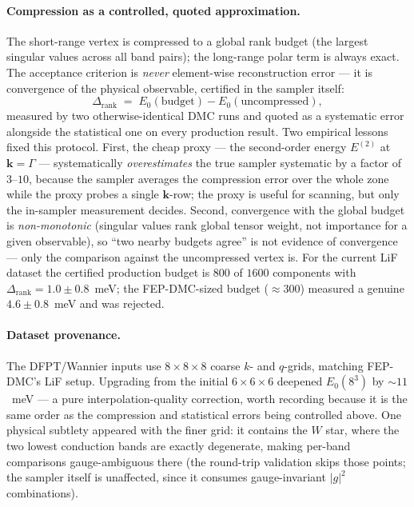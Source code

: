 \documentclass[11pt]{article}
\newcommand{\kv}{\mathbf{k}}
\begin{document}
\paragraph{Compression as a controlled, quoted approximation.}
The short-range vertex is compressed to a global rank budget (the largest singular values
across all band pairs); the long-range polar term is always exact. The acceptance
criterion is \emph{never} element-wise reconstruction error --- it is convergence of the
physical observable, certified in the sampler itself:
\[
  \Delta_{\mathrm{rank}} \;=\; E_{0}(\text{budget}) - E_{0}(\text{uncompressed}),
\]
measured by two otherwise-identical DMC runs and quoted as a systematic error alongside
the statistical one on every production result. Two empirical lessons fixed this
protocol. First, the cheap proxy --- the second-order energy $E^{(2)}$ at $\kv=\Gamma$ ---
systematically \emph{overestimates} the true sampler systematic by a factor of $3$--$10$,
because the sampler averages the compression error over the whole zone while the proxy
probes a single $\kv$-row; the proxy is useful for scanning, but only the in-sampler
measurement decides. Second, convergence with the global budget is \emph{non-monotonic}
(singular values rank global tensor weight, not importance for a given observable), so
``two nearby budgets agree'' is not evidence of convergence --- only the comparison
against the uncompressed vertex is. For the current LiF dataset the certified production
budget is $800$ of $1600$ components with $\Delta_{\mathrm{rank}}=1.0\pm0.8$~meV; the
FEP-DMC-sized budget ($\approx300$) measured a genuine $4.6\pm0.8$~meV and was rejected.

\paragraph{Dataset provenance.}
The DFPT/Wannier inputs use $8\times8\times8$ coarse $k$- and $q$-grids, matching FEP-DMC's
LiF setup. Upgrading from the initial $6\times6\times6$ deepened $E_{0}(8^{3})$ by
$\sim11$~meV --- a pure interpolation-quality correction, worth recording because it is the
same order as the compression and statistical errors being controlled above. One physical
subtlety appeared with the finer grid: it contains the $W$ star, where the two lowest
conduction bands are exactly degenerate, making per-band comparisons gauge-ambiguous
there (the round-trip validation skips those points; the sampler itself is unaffected,
since it consumes gauge-invariant $|g|^{2}$ combinations).
\end{document}
